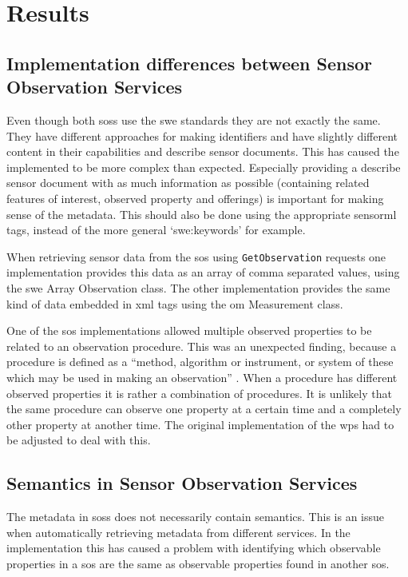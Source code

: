 
\chapter{Results}
\label{chap:results}

\section{Implementation differences between Sensor Observation Services}
Even though both \aclp{sos} use the \ac{swe} standards they are not exactly the same. They have different approaches for making identifiers and have slightly different content in their capabilities and describe sensor documents. This has caused the implemented to be more complex than expected. Especially providing a describe sensor document with as much information as possible (containing related features of interest, observed property and offerings) is important for making sense of the metadata. This should also be done using the appropriate \ac{sensorml} tags, instead of the more general `swe:keywords' for example. 

When retrieving sensor data from the \ac{sos} using \texttt{GetObservation} requests one implementation provides this data as an array of comma separated values, using the \ac{swe} Array Observation class. The other implementation provides the same kind of data embedded in \ac{xml} tags using the \ac{om} Measurement class.  

One of the \ac{sos} implementations allowed multiple observed properties to be related to an observation procedure. This was an unexpected finding, because a procedure is defined as a \enquote{method, algorithm or instrument, or system of these which may be used in making an observation} \cite[p. 4]{SW:ISO}. When a procedure has different observed properties it is rather a combination of procedures. It is unlikely that the same procedure can observe one property at a certain time and a completely other property at another time. The original implementation of the \ac{wps} had to be adjusted to deal with this.  

\section{Semantics in Sensor Observation Services}
The metadata in \aclp{sos} does not necessarily contain semantics. This is an issue when automatically retrieving metadata from different services. In the implementation this has caused a problem with identifying which observable properties in a \ac{sos} are the same as observable properties found in another \ac{sos}. 

